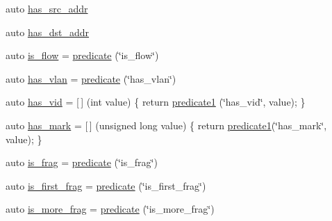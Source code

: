 \begin{DoxyCompactItemize}
\item 
auto \hyperlink{namespacepfq_1_1lang_1_1anonymous__namespace_02default_8hpp_03_acb03dd3e34d6dd7e83d621fa9077194c}{has\+\_\+src\+\_\+addr}
\item 
auto \hyperlink{namespacepfq_1_1lang_1_1anonymous__namespace_02default_8hpp_03_a0a53822af0ed8ea341f16a1da5ea83e3}{has\+\_\+dst\+\_\+addr}
\item 
auto \hyperlink{namespacepfq_1_1lang_1_1anonymous__namespace_02default_8hpp_03_ae52890434121a999589d48bccae3c3e2}{is\+\_\+flow} = \hyperlink{namespacepfq_1_1lang_a6c156f209614d0291b280153416dba97}{predicate} (\char`\"{}is\+\_\+flow\char`\"{})
\item 
auto \hyperlink{namespacepfq_1_1lang_1_1anonymous__namespace_02default_8hpp_03_a1f0378ddfa90777d11ffae5fbb57b4e0}{has\+\_\+vlan} = \hyperlink{namespacepfq_1_1lang_a6c156f209614d0291b280153416dba97}{predicate} (\char`\"{}has\+\_\+vlan\char`\"{})
\item 
auto \hyperlink{namespacepfq_1_1lang_1_1anonymous__namespace_02default_8hpp_03_a99c204d8095fdccd50d4cb24d32e5b5b}{has\+\_\+vid} = \mbox{[}$\,$\mbox{]} (int value) \{ return \hyperlink{namespacepfq_1_1lang_a3e018f096545ca95a68e67027c8e3144}{predicate1} (\char`\"{}has\+\_\+vid\char`\"{}, value); \}
\item 
auto \hyperlink{namespacepfq_1_1lang_1_1anonymous__namespace_02default_8hpp_03_aa4ce1fdb0d99e1ca0afdf76619c58d12}{has\+\_\+mark} = \mbox{[}$\,$\mbox{]} (unsigned long value) \{ return \hyperlink{namespacepfq_1_1lang_a3e018f096545ca95a68e67027c8e3144}{predicate1}(\char`\"{}has\+\_\+mark\char`\"{}, value); \}
\item 
auto \hyperlink{namespacepfq_1_1lang_1_1anonymous__namespace_02default_8hpp_03_af042e092c925ae6306ae85ae5a56563d}{is\+\_\+frag} = \hyperlink{namespacepfq_1_1lang_a6c156f209614d0291b280153416dba97}{predicate} (\char`\"{}is\+\_\+frag\char`\"{})
\item 
auto \hyperlink{namespacepfq_1_1lang_1_1anonymous__namespace_02default_8hpp_03_afb797cc442d04e614a9ac68c7c4c35ff}{is\+\_\+first\+\_\+frag} = \hyperlink{namespacepfq_1_1lang_a6c156f209614d0291b280153416dba97}{predicate} (\char`\"{}is\+\_\+first\+\_\+frag\char`\"{})
\item 
auto \hyperlink{namespacepfq_1_1lang_1_1anonymous__namespace_02default_8hpp_03_a0b169afb2f21c8626f06f77ca75feded}{is\+\_\+more\+\_\+frag} = \hyperlink{namespacepfq_1_1lang_a6c156f209614d0291b280153416dba97}{predicate} (\char`\"{}is\+\_\+more\+\_\+frag\char`\"{})
\item 

\end{DoxyCompactItemize}
